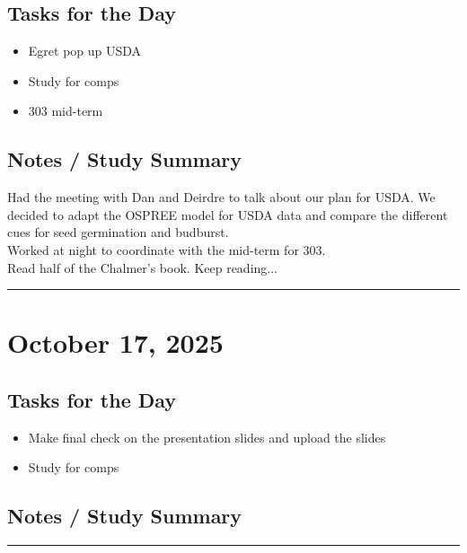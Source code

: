 \documentclass[12pt]{article}
\begin{document}
\subsection*{Tasks for the Day}
\begin{itemize}
    \item Egret pop up USDA
    \item Study for comps
    \item 303 mid-term
\end{itemize}
\subsection*{Notes / Study Summary}
Had the meeting with Dan and Deirdre to talk about our plan for USDA. We decided to adapt the OSPREE model for USDA data and compare the different cues for seed germination and budburst.\\
Worked at night to coordinate with the mid-term for 303.\\
Read half of the Chalmer's book. Keep reading...
\vspace{1em}
\hrule
\vspace{1em}

\section*{October 17, 2025}

\subsection*{Tasks for the Day}
\begin{itemize}
    \item Make final check on the presentation slides and upload the slides
    \item Study for comps
\end{itemize}
\subsection*{Notes / Study Summary}

\vspace{1em}
\hrule
\vspace{1em}
\end{document}
